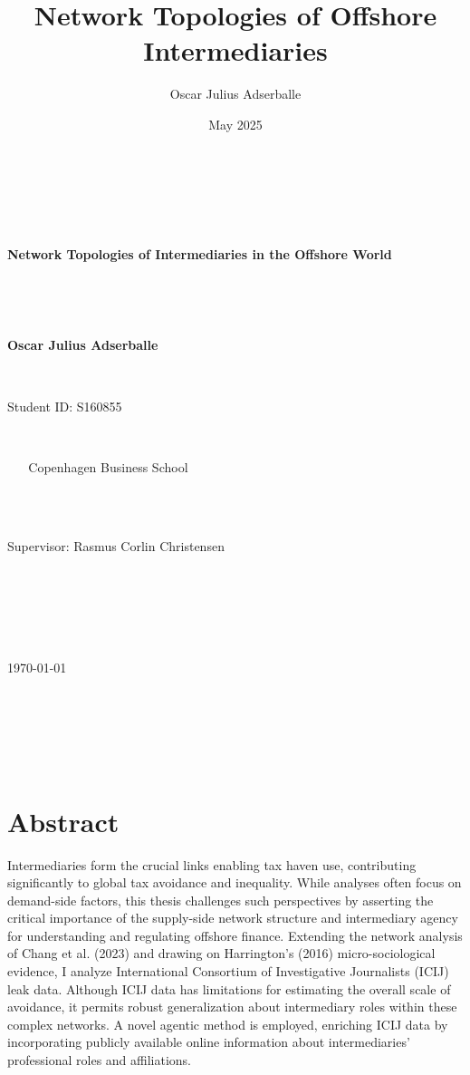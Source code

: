 \documentclass[12pt, a4paper]{report}
\title{Network Topologies of Offshore Intermediaries}
\author{Oscar Julius Adserballe} %
\date{May 2025} %
\begin{document}
\begin{titlepage}
    \centering
    \vspace*{1cm} 

    {\Huge\bfseries Network Topologies of Intermediaries in the Offshore World\par}

    \vspace{1.5cm}

    {\Large\bfseries Oscar Julius Adserballe\par} %
    {\large Student ID: S160855\par} %

    \vspace{1cm}

    {\large Copenhagen Business School} \\ %

    \vspace{2cm}

    {\large Supervisor: Rasmus Corlin Christensen\par} 

    \vspace{1.5cm}

    {\large \today\par} 

    \vfill 
\end{titlepage}

\pagestyle{plain} %

\newpage
\tableofcontents %

\newpage
\listoffigures %

\newpage
\listoftables  %

\newpage

\chapter*{Abstract}
\label{sec:abstract}

   Intermediaries form the crucial links enabling tax haven use, contributing significantly to global tax avoidance and inequality. While analyses often focus on demand-side factors, this thesis challenges such perspectives by asserting the critical importance of the supply-side network structure and intermediary agency for understanding and regulating offshore finance. Extending the network analysis of Chang et al. (2023) and drawing on Harrington's (2016) micro-sociological evidence, I analyze International Consortium of Investigative Journalists (ICIJ) leak data. Although ICIJ data has limitations for estimating the overall scale of avoidance, it permits robust generalization about intermediary roles within these complex networks. A novel agentic method is employed, enriching ICIJ data by incorporating publicly available online information about intermediaries' professional roles and affiliations. 
\end{document}
